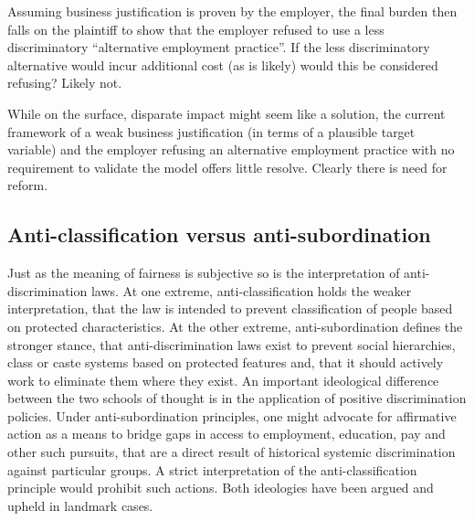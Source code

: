 Assuming business justification is proven by the employer, the final burden then falls on the plaintiff to show that the employer refused to use a less discriminatory ``alternative employment practice''. If the less discriminatory alternative would incur additional cost (as is likely) would this be considered refusing? Likely not.

While on the surface, disparate impact might seem like a solution, the current framework of a weak business justification (in terms of a plausible target variable) and the employer refusing an alternative employment practice with no requirement to validate the model offers little resolve. Clearly there is need for reform.

\subsection{Anti-classification versus anti-subordination}

Just as the meaning of fairness is subjective so is the interpretation of anti-discrimination laws. At one extreme, anti-classification holds the weaker interpretation, that the law is intended to prevent classification of people based on protected characteristics. At the other extreme, anti-subordination defines the stronger stance, that anti-discrimination laws exist to prevent social hierarchies, class or caste systems based on protected features and, that it should actively work to eliminate them where they exist. An important ideological difference between the two schools of thought is in the application of positive discrimination policies. Under anti-subordination principles, one might advocate for affirmative action as a means to bridge gaps in access to employment, education, pay and other such pursuits, that are a direct result of historical systemic discrimination against particular groups. A strict interpretation of the anti-classification principle would prohibit such actions. Both ideologies have been argued and upheld in landmark cases.

